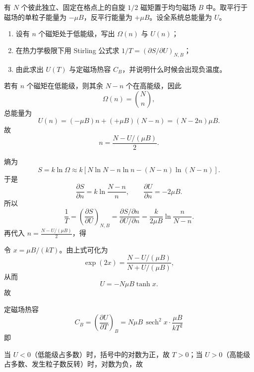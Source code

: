 \begin{question}[18分]
有 $N$ 个彼此独立、固定在格点上的自旋 $1/2$ 磁矩置于均匀磁场 $B$ 中。取平行于磁场的单粒子能量为 $-\mu B$，反平行能量为 $+\mu B$。设全系统总能量为 $U$。
\begin{enumerate}[label=(\arabic*),leftmargin=2.8em,itemsep=0.2em]
\item 设有 $n$ 个磁矩处于低能级，写出 $\Omega(n)$ 与 $U(n)$；
\item 在热力学极限下用 Stirling 公式求 $1/T=(\partial S/\partial U)_{N,B}$；
\item 由此求出 $U(T)$ 与定磁场热容 $C_B$，并说明什么时候会出现负温度。
\end{enumerate}
\begin{solution}

若有 $n$ 个磁矩在低能级，则其余 $N-n$ 个在高能级，因此
\[
\Omega(n)=\binom{N}{n},
\]
总能量为
\[
U(n)=(-\mu B)n+(+\mu B)(N-n)=(N-2n)\mu B.
\]
故
\[
n=\frac{N-U/(\mu B)}{2}.
\]

熵为
\[
S=k\ln \Omega
\approx k\left[N\ln N-n\ln n-(N-n)\ln(N-n)\right].
\]
于是
\[
\frac{\partial S}{\partial n}
=k\ln\frac{N-n}{n},
\qquad
\frac{\partial U}{\partial n}=-2\mu B.
\]
所以
\[
\frac{1}{T}
=\left(\frac{\partial S}{\partial U}\right)_{N,B}
=\frac{\partial S/\partial n}{\partial U/\partial n}
=\frac{k}{2\mu B}\ln\frac{n}{N-n}.
\]
再代入 $n=\frac{N-U/(\mu B)}{2}$，得

令 $x=\mu B/(kT)$。由上式可化为
\[
\exp(2x)=\frac{N-U/(\mu B)}{N+U/(\mu B)},
\]
从而
\[
U=-N\mu B\tanh x.
\]
故

定磁场热容
\[
C_B=\left(\frac{\partial U}{\partial T}\right)_B
=N\mu B\,\operatorname{sech}^2 x\cdot \frac{\mu B}{kT^2}
\]
即

当 $U<0$（低能级占多数）时，括号中的对数为正，故 $T>0$；当 $U>0$（高能级占多数、发生粒子数反转）时，对数为负，故
\end{solution}
\end{question}

